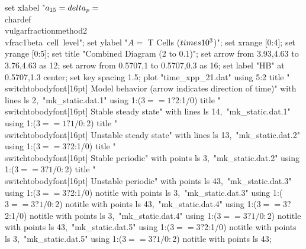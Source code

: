   set xlabel "$a_{15} = \\delta_p = $\\chardef\\vulgarfractionmethod2\\vfrac1{beta~cell~level}";
  set ylabel "$A = $ T Cells ($\\times 10^3$)";
  set xrange [0:4];
  set yrange [0:5];
  set title "Combined Diagram (2 to 0.1)";
  set arrow from 3.93,4.63 to 3.76,4.63 as 12;
  set arrow from 0.5707,1 to 0.5707,0.3 as 16;
  set label "HB" at 0.5707,1.3 center;
  set key spacing 1.5;
  plot "time_xpp_21.dat" using 5:2 title "\\switchtobodyfont[16pt] Model behavior (arrow indicates direction of time)" with lines ls 2,\
       "mk_static.dat.1" using 1:($3==1?$2:1/0) title "\\switchtobodyfont[16pt] Stable steady state" with lines ls 14,\
       "mk_static.dat.1" using 1:($3==1?1/0:$2) title "\\switchtobodyfont[16pt] Unstable steady state" with lines ls 13,\
       "mk_static.dat.2" using 1:($3==3?$2:1/0) title "\\switchtobodyfont[16pt] Stable periodic" with points ls 3,\
       "mk_static.dat.2" using 1:($3==3?1/0:$2) title "\\switchtobodyfont[16pt] Unstable periodic" with points ls 43,\
       "mk_static.dat.3" using 1:($3==3?$2:1/0) notitle with points ls 3,\
       "mk_static.dat.3" using 1:($3==3?1/0:$2) notitle with points ls 43,\
       "mk_static.dat.4" using 1:($3==3?$2:1/0) notitle with points ls 3,\
       "mk_static.dat.4" using 1:($3==3?1/0:$2) notitle with points ls 43,\
       "mk_static.dat.5" using 1:($3==3?$2:1/0) notitle with points ls 3,\
       "mk_static.dat.5" using 1:($3==3?1/0:$2) notitle with points ls 43;
\stopGNUPLOTscript

